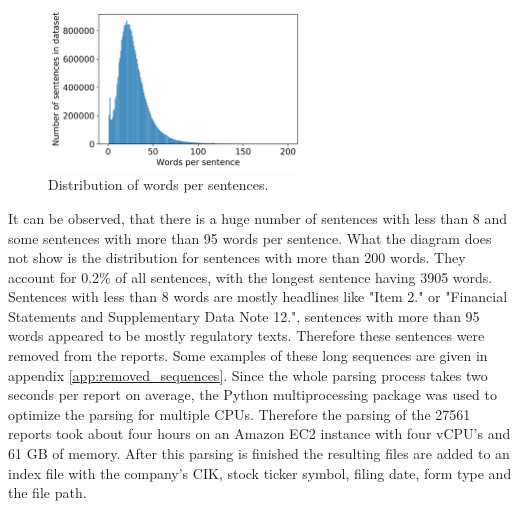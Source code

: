 \begin{figure}[h]
    \centering
    \includegraphics[width=0.6\textwidth]{figures/charts/words_distribution.png}
    \caption{Distribution of words per sentences.}
    \label{figure:words_distribution}
\end{figure}
It can be observed, that there is a huge number of sentences with less than 8 and some sentences with more than 95 words per sentence.
What the diagram does not show is the distribution for sentences with more than 200 words.
They account for 0.2\% of all sentences, with the longest sentence having 3905 words.
Sentences with less than 8 words are mostly headlines like "Item 2." or "Financial Statements and Supplementary Data Note 12.", sentences with more than 95 words appeared to be mostly regulatory texts.
Therefore these sentences were removed from the reports.
Some examples of these long sequences are given in appendix \ref{app:removed_sequences}.
Since the whole parsing process takes two seconds per report on average, the Python multiprocessing package was used to optimize the parsing for multiple \acs{CPU}s.
Therefore the parsing of the 27561 reports took about four hours on an Amazon EC2 instance with four v\acs{CPU}'s and 61 GB of memory.
After this parsing is finished the resulting files are added to an index file with the company's \ac{CIK}, stock ticker symbol, filing date, form type and the file path.

